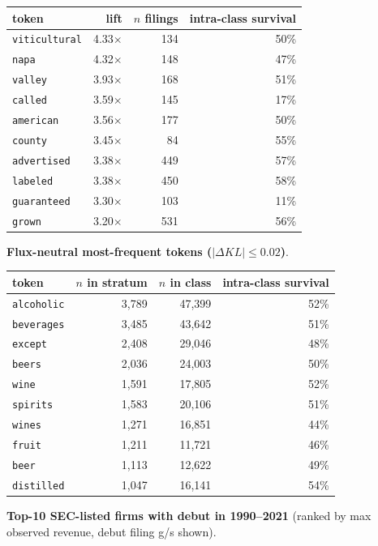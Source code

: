 \begin{tabular}{lrrr}
\toprule
token & lift & $n$ filings & intra-class survival \\
\midrule
\texttt{viticultural} & 4.33$\times$ & 134 & 50\% \\
\texttt{napa} & 4.32$\times$ & 148 & 47\% \\
\texttt{valley} & 3.93$\times$ & 168 & 51\% \\
\texttt{called} & 3.59$\times$ & 145 & 17\% \\
\texttt{american} & 3.56$\times$ & 177 & 50\% \\
\texttt{county} & 3.45$\times$ & 84 & 55\% \\
\texttt{advertised} & 3.38$\times$ & 449 & 57\% \\
\texttt{labeled} & 3.38$\times$ & 450 & 58\% \\
\texttt{guaranteed} & 3.30$\times$ & 103 & 11\% \\
\texttt{grown} & 3.20$\times$ & 531 & 56\% \\
\bottomrule
\end{tabular}

\textbf{Flux-neutral most-frequent tokens ($|\Delta KL|\leq 0.02$)}.

\begin{tabular}{lrrr}
\toprule
token & $n$ in stratum & $n$ in class & intra-class survival \\
\midrule
\texttt{alcoholic} & 3,789 & 47,399 & 52\% \\
\texttt{beverages} & 3,485 & 43,642 & 51\% \\
\texttt{except} & 2,408 & 29,046 & 48\% \\
\texttt{beers} & 2,036 & 24,003 & 50\% \\
\texttt{wine} & 1,591 & 17,805 & 52\% \\
\texttt{spirits} & 1,583 & 20,106 & 51\% \\
\texttt{wines} & 1,271 & 16,851 & 44\% \\
\texttt{fruit} & 1,211 & 11,721 & 46\% \\
\texttt{beer} & 1,113 & 12,622 & 49\% \\
\texttt{distilled} & 1,047 & 16,141 & 54\% \\
\bottomrule
\end{tabular}

\textbf{Top-10 SEC-listed firms with debut in 1990--2021} (ranked by max observed revenue, debut filing g/s shown).


